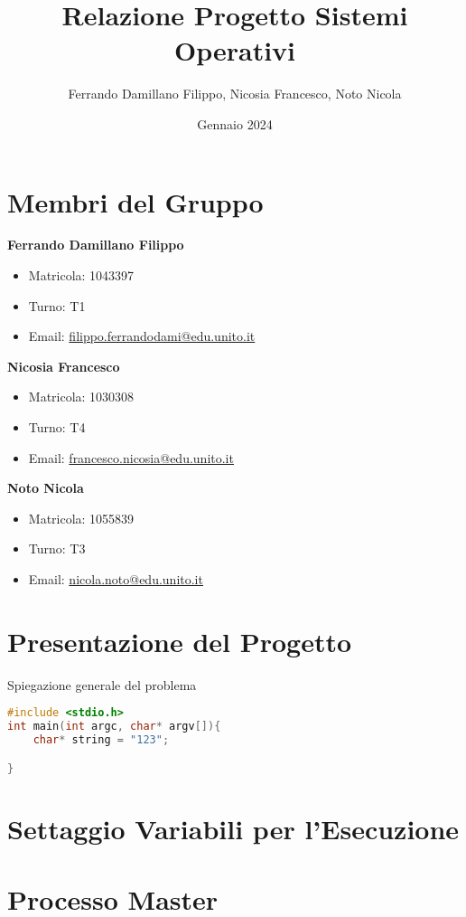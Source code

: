 \documentclass{article}
\title{Relazione Progetto Sistemi Operativi}
\author{Ferrando Damillano Filippo, Nicosia Francesco, Noto Nicola}
\date{Gennaio 2024}
\begin{document}
\maketitle

\tableofcontents

\section{Membri del Gruppo}

\textbf{Ferrando Damillano Filippo}
\begin{itemize}
    \item Matricola: 1043397
    \item Turno: T1    
    \item Email: \href{mailto:filippo.ferrandodami@edu.unito.it}{filippo.ferrandodami@edu.unito.it}
\end{itemize}
\textbf{Nicosia Francesco}
\begin{itemize}
    \item Matricola: 1030308
    \item Turno: T4
    \item Email: \href{mailto:francesco.nicosia@edu.unito.it}{francesco.nicosia@edu.unito.it}
\end{itemize}
\textbf{Noto Nicola}
\begin{itemize}
    \item Matricola: 1055839
    \item Turno: T3
    \item Email: \href{mailto:nicola.noto@edu.unito.it}{nicola.noto@edu.unito.it}
\end{itemize}

\section{Presentazione del Progetto}
Spiegazione generale del problema

\begin{lstlisting}[language=C]
#include <stdio.h>
int main(int argc, char* argv[]){
    char* string = "123";

}
\end{lstlisting}

\section{Settaggio Variabili per l'Esecuzione}

\section{Processo Master}
\end{document}
